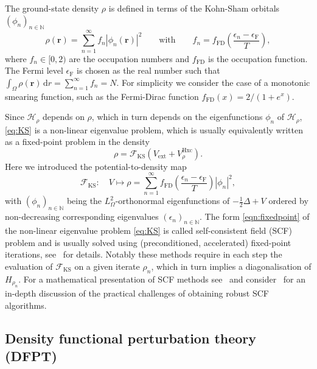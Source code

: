 \documentclass[hidelinks,onefignum,onetabnum]{siamart250211}
\newcommand{\N}{\mathbb{N}}
\newcommand{\D}{\mathrm{d}}
\renewcommand{\vec}{\bm}
\newcommand{\Vext}{V_{\mathrm{ext}}} %
\newcommand{\VHxc}{V^{\text{Hxc}}} %
\newcommand{\fFD}{f_{\mathrm{FD}}}
\newcommand{\epsilonF}{\epsilon_{\mathrm{F}}}
\newcommand{\FKS}{\mathcal{F}_{\mathrm{KS}}}
\newcommand{\Hrho}{\mathcal{H}_\rho}
\begin{document}
The ground-state density $\rho$ is defined in terms of the Kohn-Sham orbitals $(\phi_n)_{n\in\N}$ %
\begin{equation}
    \rho(\vec r) = \sum_{n=1}^{\infty} f_n \left| \phi_n(\bm r) \right|^2
    \qquad \text{with} \qquad
    f_n = \fFD\left(\dfrac{\epsilon_n - \epsilonF}{T}\right),
    \label{eqn:density}
\end{equation}
where $f_n \in [0, 2)$ are the occupation numbers and
$\fFD$ is the occupation function.
The Fermi level $\epsilonF$ is chosen as the real number such that
%
    $\int_\Omega \rho(\vec{r}) \,\D r = \sum_{n=1}^{\infty} f_n = N$.
%
For simplicity we consider the case of a monotonic smearing function,
such as the Fermi-Dirac function $\fFD(x) = 2/(1+e^x)$.

Since $\Hrho$ depends on $\rho$, which in turn depends on the eigenfunctions $\phi_n$ of $\Hrho$,
\eqref{eq:KS} is a non-linear eigenvalue problem, which is usually equivalently written as a
fixed-point problem in the density
\begin{equation}
    \label{eqn:fixedpoint}
    \rho = \FKS\left(\Vext + \VHxc_\rho \right).
\end{equation}
Here we introduced the potential-to-density map
\begin{equation}
    \label{eqn:potdensmap}
    \FKS: \quad V \mapsto \rho = \sum_{n=1}^{\infty} \fFD\left(\dfrac{\epsilon_n - \epsilonF}{T}\right) \left| \phi_n \right|^2,
\end{equation}
with $(\phi_n)_{n\in\N}$ being the $L^2_{\Omega}$-orthonormal eigenfunctions of $- \frac{1}{2}\Delta + V$
ordered by non-decreasing corresponding eigenvalues $(\epsilon_n)_{n\in\N}$.
The form \eqref{eqn:fixedpoint} of the non-linear eigenvalue problem \eqref{eq:KS}
is called self-consistent field (SCF) problem and is usually solved using
(preconditioned, accelerated) fixed-point iterations,
see~\cite{lin2019KSDFT,cances2021convergence,Herbst2022,cances2023KSmodels} for details.
Notably these methods require in each step the evaluation of $\FKS$ on a given iterate $\rho_n$,
which in turn implies a diagonalisation of $H_{\rho_n}$.
For a mathematical presentation of SCF methods see~\cite{cances2021convergence,lin2019math_electronic,cances2023KSmodels}
and consider~\cite{herbstBlackboxInhomogeneousPreconditioning2020,Herbst2022} for an in-depth discussion
of the practical challenges of obtaining robust SCF algorithms.

\subsection{Density functional perturbation theory (DFPT)}
\label{sec:dfpt}
\end{document}
